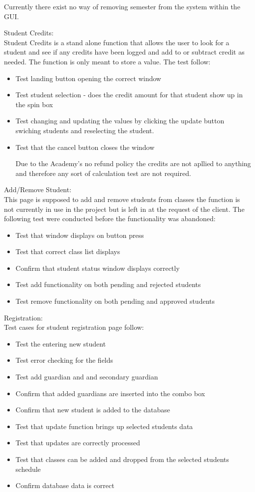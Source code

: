 Currently there exist no way of removing semester from the system within the GUI.

Student Credits:\\
Student Credits is a stand alone function that allows the user to look for a student and see if any credits have been logged and add to or subtract credit as needed. The function is only meant to store a value. The test follow:

\begin{itemize}
\item Test landing button opening the correct window
\item Test student selection - does the credit amount for that student show up in the spin box
\item Test changing and updating the values by clicking the update button swiching students and reselecting the student.
\item Test that the cancel button closes the window

Due to the Academy's no refund policy the credits are not apllied to anything and therefore any sort of calculation test are not required.
\end{itemize}

Add/Remove Student:\\
This page is supposed to add and remove students from classes the function is not currently in use in the project but is left in at the request of the client. The following test were conducted before the functionality was abandoned:

\begin{itemize}
\item Test that window displays on button press
\item Test that correct class list displays
\item Confirm that student status window displays correctly
\item Test add functionality on both pending and rejected students
\item Test remove functionality on both pending and approved students
\end{itemize}

Registration:\\
Test cases for student registration page follow:

\begin{itemize}
\item Test the entering new student
\item Test error checking for the fields
\item Test add guardian and and secondary guardian
\item Confirm that added guardians are inserted into the combo box
\item Confirm that new student is added to the database
\item Test that update function brings up selected students data
\item Test that updates are correctly processed
\item Test that classes can be added and dropped from the selected students schedule
\item Confirm database data is correct 
\end{itemize}

